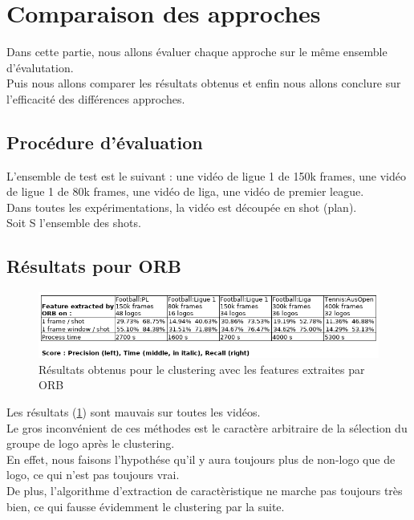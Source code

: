 \documentclass[11pt]{article}
\begin{document}
\newpage
\section{Comparaison des approches}
\label{sec:org5d67bc6}
Dans cette partie, nous allons évaluer chaque approche sur le même ensemble d'évalutation.\\
Puis nous allons comparer les résultats obtenus et enfin nous allons conclure sur l'efficacité des différences approches.\\

\subsection{Procédure d'évaluation}
\label{sec:orgacae81b}
L'ensemble de test est le suivant : une vidéo de ligue 1 de 150k frames, une vidéo de ligue 1 de 80k frames, une vidéo de liga, une vidéo de premier league.\\
Dans toutes les expérimentations, la vidéo est découpée en shot (plan).\\
Soit S l'ensemble des shots.\\

\subsection{Résultats pour ORB}
\label{sec:org1e20e23}
\begin{figure}[htbp]
\centering
\includegraphics[width=15cm]{res_orb.png}
\caption{Résultats obtenus pour le clustering avec les features extraites par ORB \label{orb-res}}
\end{figure}

Les résultats (\ref{orb-res}) sont mauvais sur toutes les vidéos.\\
Le gros inconvénient de ces méthodes est le caractère arbitraire de la sélection du groupe de logo après le clustering.\\
En effet, nous faisons l'hypothése qu'il y aura toujours plus de non-logo que de logo, ce qui n'est pas toujours vrai.\\
De plus, l'algorithme d'extraction de caractèristique ne marche pas toujours très bien, ce qui fausse évidemment le clustering par la suite.\\
\end{document}
